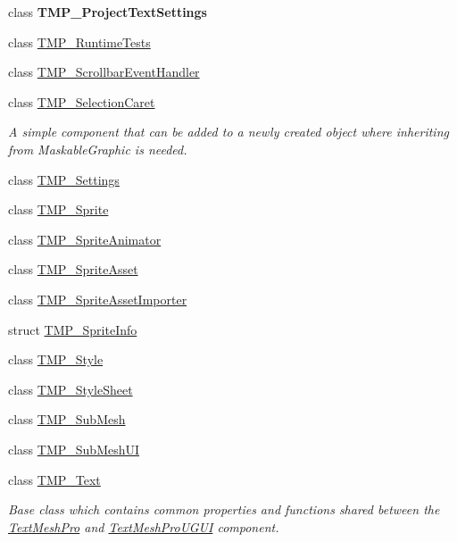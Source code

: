 \begin{DoxyCompactItemize}
class {\bfseries T\+M\+P\+\_\+\+Project\+Text\+Settings}
\item 
class \mbox{\hyperlink{class_t_m_pro_1_1_t_m_p___runtime_tests}{T\+M\+P\+\_\+\+Runtime\+Tests}}
\item 
class \mbox{\hyperlink{class_t_m_pro_1_1_t_m_p___scrollbar_event_handler}{T\+M\+P\+\_\+\+Scrollbar\+Event\+Handler}}
\item 
class \mbox{\hyperlink{class_t_m_pro_1_1_t_m_p___selection_caret}{T\+M\+P\+\_\+\+Selection\+Caret}}
\begin{DoxyCompactList}\small\item\em A simple component that can be added to a newly created object where inheriting from Maskable\+Graphic is needed. \end{DoxyCompactList}\item 
class \mbox{\hyperlink{class_t_m_pro_1_1_t_m_p___settings}{T\+M\+P\+\_\+\+Settings}}
\item 
class \mbox{\hyperlink{class_t_m_pro_1_1_t_m_p___sprite}{T\+M\+P\+\_\+\+Sprite}}
\item 
class \mbox{\hyperlink{class_t_m_pro_1_1_t_m_p___sprite_animator}{T\+M\+P\+\_\+\+Sprite\+Animator}}
\item 
class \mbox{\hyperlink{class_t_m_pro_1_1_t_m_p___sprite_asset}{T\+M\+P\+\_\+\+Sprite\+Asset}}
\item 
class \mbox{\hyperlink{class_t_m_pro_1_1_t_m_p___sprite_asset_importer}{T\+M\+P\+\_\+\+Sprite\+Asset\+Importer}}
\item 
struct \mbox{\hyperlink{struct_t_m_pro_1_1_t_m_p___sprite_info}{T\+M\+P\+\_\+\+Sprite\+Info}}
\item 
class \mbox{\hyperlink{class_t_m_pro_1_1_t_m_p___style}{T\+M\+P\+\_\+\+Style}}
\item 
class \mbox{\hyperlink{class_t_m_pro_1_1_t_m_p___style_sheet}{T\+M\+P\+\_\+\+Style\+Sheet}}
\item 
class \mbox{\hyperlink{class_t_m_pro_1_1_t_m_p___sub_mesh}{T\+M\+P\+\_\+\+Sub\+Mesh}}
\item 
class \mbox{\hyperlink{class_t_m_pro_1_1_t_m_p___sub_mesh_u_i}{T\+M\+P\+\_\+\+Sub\+Mesh\+UI}}
\item 
class \mbox{\hyperlink{class_t_m_pro_1_1_t_m_p___text}{T\+M\+P\+\_\+\+Text}}
\begin{DoxyCompactList}\small\item\em Base class which contains common properties and functions shared between the \mbox{\hyperlink{class_t_m_pro_1_1_text_mesh_pro}{Text\+Mesh\+Pro}} and \mbox{\hyperlink{class_t_m_pro_1_1_text_mesh_pro_u_g_u_i}{Text\+Mesh\+Pro\+U\+G\+UI}} component. \end{DoxyCompactList}\item 

\end{DoxyCompactItemize}
